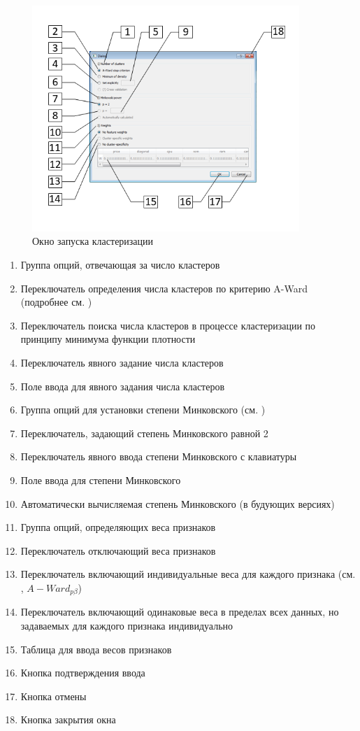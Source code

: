 \documentclass[12pt,twoside,a4paper,tikz,border=5]{refart}
\begin{document}
\begin{figure}[h!]
	\centering
	\includegraphics[width=0.9\textwidth]{img/runclusteringwindow}
	\caption{Окно запуска кластеризации}
	\label{fig:runclusteringwindow}
\end{figure}


\begin{enumerate}
	\item Группа опций, отвечающая за число кластеров
	\item Переключатель определения числа кластеров по критерию A-Ward (подробнее см. \cite{mirkin_formula_8})
	\item Переключатель поиска числа кластеров в процессе кластеризации по принципу минимума функции плотности \cite{kovaleva}
	\item Переключатель явного задание числа кластеров 
	\item Поле ввода для явного задания числа кластеров 
	\item Группа опций для установки степени Минковского (см. \cite{amorim})
	\item Переключатель, задающий степень Минковского равной 2
	\item Переключатель явного ввода степени Минковского с клавиатуры
	\item Поле ввода для степени Минковского
	\item Автоматически вычисляемая степень Минковского (в будующих версиях)
	\item Группа опций, определяющих веса признаков
	\item Переключатель отключающий веса признаков
	\item Переключатель включающий индивидуальные веса для каждого признака (см. \cite{amorim}, $A-Ward_{p\beta}$)
	\item Переключатель включающий одинаковые веса в пределах всех данных, но задаваемых для каждого признака индивидуально 
	\item Таблица для ввода весов признаков
	\item Кнопка подтверждения ввода
	\item Кнопка отмены
	\item Кнопка закрытия окна
\end{enumerate}
\end{document}
